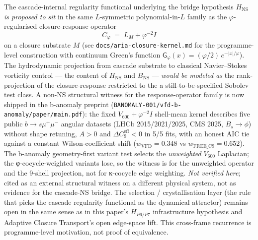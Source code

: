 \documentclass[11pt, a4paper]{amsart}
\theoremstyle{definition}
\begin{document}
The cascade-internal regularity functional underlying the bridge
hypothesis $H_{\mathrm{NS}}$ \emph{is proposed to sit} in the same
$L$-symmetric polynomial-in-$L$ family as the
$\varphi$-regularised closure-response operator
\[
C_\varphi \;=\; L_M + \varphi^{-2} I
\]
on a closure substrate $M$ (see
\texttt{docs/aria-closure-kernel.md} for the programme-level
construction with continuum Green's function
$\mathsf G_\varphi(x) = (\varphi/2)\,e^{-|x|/\varphi}$).  The
hydrodynamic projection from cascade substrate to classical
Navier--Stokes vorticity control --- the content of
$H_{\mathrm{NS}}$ and $B_{\mathrm{NS}}$ --- \emph{would be modeled
as} the rank-projection of the closure-response restricted to the
a still-to-be-specified Sobolev test class.  A non-NS structural witness for the response-operator family is
now shipped in the b-anomaly preprint
(\texttt{BANOMALY-001/vfd-b-anomaly/paper/main.pdf}): the fixed
$V_{600} + \varphi^{-2} I$ shell-mean kernel describes five public
$b\to s\mu^+\mu^-$ angular datasets (LHCb 2015/2021/2025, CMS 2025,
$B_s\!\to\!\phi$) without shape retuning, $A>0$ and
$\Delta C_9^{\mathrm{eff}}<0$ in 5/5 fits, with an honest AIC tie
against a constant Wilson-coefficient shift ($w_{\mathrm{VFD}}=0.348$
vs $w_{\mathrm{FREE\_C9}}=0.652$). The b-anomaly geometry-first
variant test selects the \emph{unweighted} $V_{600}$ Laplacian; the
φ-cocycle-weighted variants lose, so the witness is for the
unweighted operator and the 9-shell projection, not for κ-cocycle
edge weighting. \emph{Not verified here}; cited as an external
structural witness on a different physical system, not as
evidence for the cascade-NS bridge.
The selection / crystallisation layer (the rule that picks the
cascade regularity functional as the dynamical attractor) remains
open in the same sense as in this paper's $H_{P6/P7}$ infrastructure
hypothesis and Adaptive Closure Transport's open edge-space lift.
This cross-frame recurrence is programme-level motivation, not
proof of equivalence.
\end{document}
